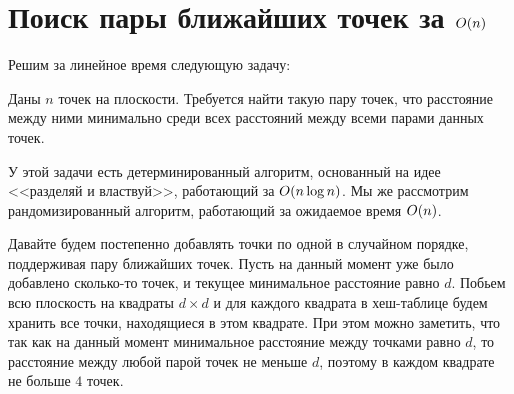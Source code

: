 \chapter{Поиск пары ближайших точек за $O(n)$} \label{closest-points}

Решим за линейное время следующую задачу:

\begin{problem}
    Даны $n$ точек на плоскости. Требуется найти такую пару точек, что расстояние между ними минимально среди всех расстояний между всеми парами данных точек.
\end{problem}

У этой задачи есть детерминированный алгоритм, основанный на идее <<разделяй и властвуй>>, работающий за $O(n \log n)$.
Мы же рассмотрим рандомизированный алгоритм, работающий за ожидаемое время $O(n)$.

Давайте будем постепенно добавлять точки по одной в случайном порядке, поддерживая пару ближайших точек. Пусть на данный момент уже было добавлено сколько-то точек, и текущее минимальное расстояние равно $d$. Побьем всю плоскость на квадраты $d \times d$ и для каждого квадрата в хеш-таблице будем хранить все точки, находящиеся в этом квадрате. При этом можно заметить, что так как на данный момент минимальное расстояние между точками равно $d$, то расстояние между любой парой точек не меньше $d$, поэтому в каждом квадрате не больше $4$ точек.


